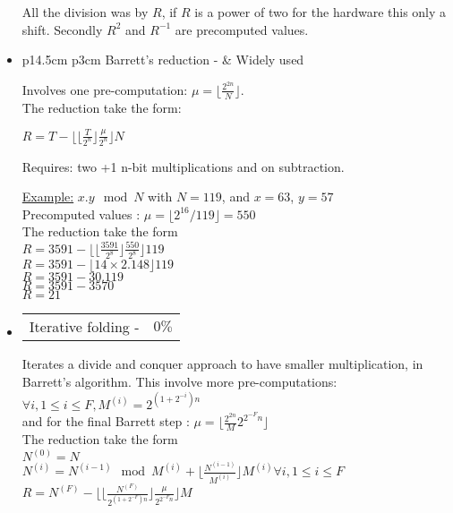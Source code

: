 \begin{itemize}
			All the division was by $R$, if $R$ is a power of two for the hardware this only a shift. 
			Secondly $R^{2}$ and $R^{-1}$ are precomputed values.	  
					   

	\item \begin{tabularx}{\linewidth}{ p{14.5cm} p{3cm} }
		Barrett's reduction -\textit{\cite{crypto-1986-barrett}} & Widely used 
		\end{tabularx}
		Involves one pre-computation: 
		$\mu = \lfloor \frac{2^{2n}}{N} \rfloor$.\\
		The reduction take the form:
		\begin{center}
			$R = T - \lfloor \lfloor \frac{T}{2^{n}} \rfloor \frac{\mu}{2^{n}} \rfloor N$\\
		\end{center}		

		Requires: two +1 n-bit multiplications and on subtraction.

		\underline{Example:}
			$x.y \mod N$  with $N = 119$, and $x = 63$, $y = 57$\\
			Precomputed values :
			$\mu  = \lfloor 2^{16}/119 \rfloor  = 550$\\
			
			The reduction take the form\\
			$R = 3591 - \lfloor \lfloor \frac{3591}{2^{8}} \rfloor \frac{550}{2^{8}} \rfloor 119$\\
			$R = 3591 - \lfloor 14 \times 2.148 \rfloor 119$\\
			$R = 3591 - 30.119$\\
			$R = 3591 - 3570$\\
			$R = 21 $ 


	\item \begin{tabularx}{\linewidth}{ p{14.5cm} p{3cm} }
		Iterative folding -\textit{\cite{arith-2007-hasenplaugh}} & $0\%$ 
		\end{tabularx}
		Iterates a divide and conquer approach to have smaller multiplication, in Barrett's algorithm. This involve more pre-computations: 
		$\forall i, 1 \leq i \leq F, M^{(i)} = 2^{(1+2^{-i})n}$ \\
		and for the final Barrett step :
		$ \mu = \lfloor \frac{2^{2n}}{M}  2^{2^{-F}n}\rfloor$\\

		The reduction take the form\\
		$N^{(0)} =N$\\
		$N^{(i)} =N^{(i-1)} \mod M^{(i)} + \lfloor \frac{N^{(i-1)}}{M^{(i)}}  \rfloor M^{(i)}\forall i, 1 \leq i \leq F$\\
		$	R = N^{(F)} - \lfloor \lfloor \frac{N^{(F)}}{2^{(1+2^{-F})n}} \rfloor \frac{\mu}{2^{2^{-F}n}} \rfloor M$\\


\end{itemize}
